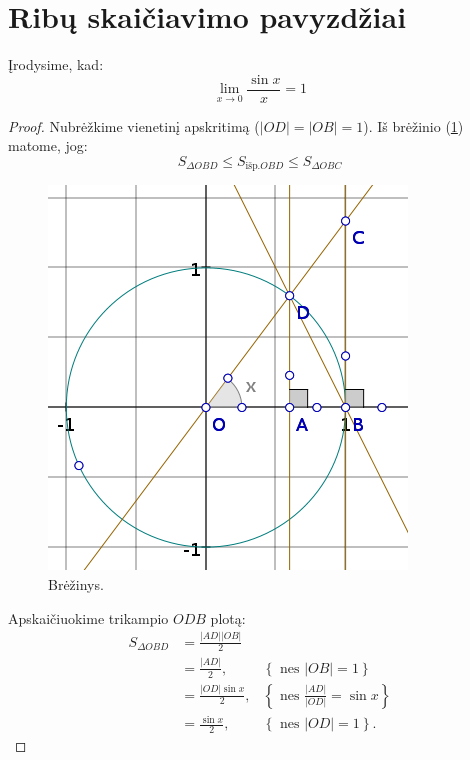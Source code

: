 \section{Ribų skaičiavimo pavyzdžiai}

\begin{exmp}
  Įrodysime, kad:
  \begin{equation*}
    \lim _{x \to 0} \frac{\sin x}{x} = 1
  \end{equation*}

  \begin{proof}

    Nubrėžkime vienetinį apskritimą ($|OD| = |OB| = 1$). Iš 
    brėžinio (\ref{fig:sinx_x}) matome, jog:
    \begin{equation}
      S _{\Delta OBD} \leq S _{\text{išp.}OBD} \leq S _{\Delta OBC}
      \label{_sinx_x_01}
    \end{equation}

    \begin{figure}[h!]
      \begin{center}
        \includegraphics[]{images/sinx_x.png}
      \end{center}
      \caption{Brėžinys.}
      \label{fig:sinx_x}
    \end{figure}

    Apskaičiuokime trikampio $ODB$ plotą:
    \begin{align*}
      S _{\Delta OBD} &= \frac{ |AD| |OB| }{2} \\
      &= \frac{ |AD| }{2}, &\left\{ \text{ nes } |OB| = 1 \right\} \\
      &= \frac{ |OD| \sin x }{2}, 
      &\left\{ \text{ nes } \frac{ |AD| }{ |OD| } = \sin x \right\} \\
      &= \frac{ \sin x }{2}, &\left\{ \text{ nes } |OD| = 1 \right\}.
    \end{align*}


\end{proof}
\end{exmp}
